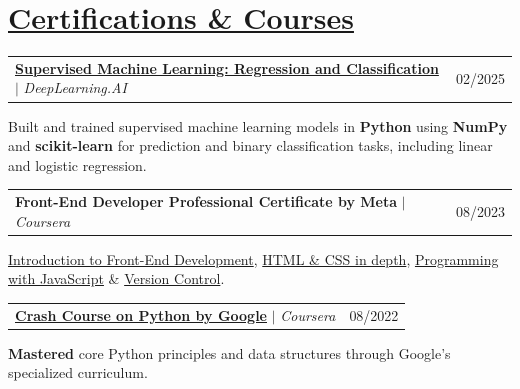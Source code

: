 \documentclass[a4paper, 11pt]{article}
\makeatletter
\newcommand{\resumeProjectHeading}[2]{
  \item
  \begin{tabular*}{1.0\textwidth}[t]{l@{\extracolsep{\fill}}r}
    #1 & #2
  \end{tabular*}
}
\makeatother
\begin{document}
\section{\href{https://www.linkedin.com/in/deeptejdhauskar/details/certifications/}{Certifications \& Courses}}
\begin{outerlist}[itemsep=0pt] %
    \resumeProjectHeading
      {\textbf{\href{https://www.coursera.org/account/accomplishments/verify/W24092VGQ0WE}{Supervised Machine Learning: Regression and Classification}} $|$ \emph{DeepLearning.AI}}{02/2025}
    \begin{innerlist}
      \item Built and trained supervised machine learning models in \textbf{Python} using \textbf{NumPy} and \textbf{scikit-learn} for prediction and binary classification tasks, including linear and logistic regression.
    \end{innerlist}

    \resumeProjectHeading
      {\textbf{Front-End Developer Professional Certificate by Meta} $|$ \emph{Coursera}}{08/2023}
    \begin{innerlist}
      \item \href{https://www.coursera.org/account/accomplishments/verify/4VLZFNHWWPES}{Introduction to Front-End Development}, \href{https://coursera.org/share/1a98c2cd3af76d1d880ba9151df11632}{HTML \& CSS in depth}, \href{https://coursera.org/share/7a06e029c275f52c806a7e7cbf0b4c33}{Programming with JavaScript} \& \href{https://coursera.org/share/029074d0b4996a5029c9302612556b29}{Version Control}.
    \end{innerlist}

    \resumeProjectHeading
      {\textbf{\href{https://coursera.org/share/8606eb888ff08b05bdca22b247e1f823}{Crash Course on Python by Google}} $|$ \emph{Coursera}}{08/2022}
    \begin{innerlist}
      \item \textbf{Mastered} core Python principles and data structures through Google's specialized curriculum.
    \end{innerlist}


\end{outerlist}
\end{document}
